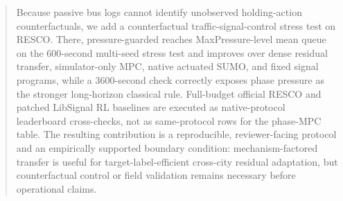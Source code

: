\begin{abstract}
Because passive bus logs cannot identify unobserved holding-action counterfactuals, we add a counterfactual traffic-signal-control stress test on RESCO.
There, pressure-guarded \ours reaches MaxPressure-level mean queue on the 600-second multi-seed stress test and improves over dense residual transfer, simulator-only MPC, native actuated SUMO, and fixed signal programs, while a 3600-second check correctly exposes phase pressure as the stronger long-horizon classical rule.
Full-budget official RESCO and patched LibSignal RL baselines are executed as native-protocol leaderboard cross-checks, not as same-protocol rows for the \ours phase-MPC table.
The resulting contribution is a reproducible, reviewer-facing protocol and an empirically supported boundary condition: mechanism-factored transfer is useful for target-label-efficient cross-city residual adaptation, but counterfactual control or field validation remains necessary before operational claims.
\end{abstract}
